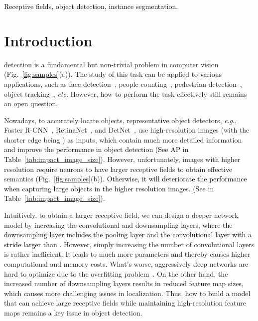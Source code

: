 \documentclass[journal]{IEEEtran}
\newcommand{\etc}{\textit{etc}\xspace}
\newcommand{\eg}{\textit{e}.\textit{g}.\xspace}
\def\qi{\textcolor{black}}
\def\qii{\textcolor{black}}
\def\myblue{\textcolor{black}}
\begin{document}
\begin{IEEEkeywords}
		\qi{Receptive fields, object detection, instance segmentation.}
	\end{IEEEkeywords}
	
	
	
	
	
\IEEEpeerreviewmaketitle
	


	\section{Introduction}


	
	
	
	 detection is a fundamental but non-trivial problem in computer vision (Fig.~\ref{fig:samples}(a)).
The study of this task can be applied to \myblue{various} applications, such as face detection~\cite{jiang2017face,yang2016wider,yang2018faceness}, people counting~\cite{shami2018people,stewart2016end}, pedestrian detection~\cite{wang2018pedestrian,li2017scale,qian2019oriented}, object tracking~\cite{feichtenhofer2017detect,yuan2017incremental,chen2018learning,hu2018robust,wang2018learning}, \etc. However, how to \myblue{perform} the task effectively still remains an open question.


	
	Nowadays, to accurately locate objects, representative object detectors, \eg, Faster R-CNN~\cite{ren2015faster}, RetinaNet~\cite{lin2017focal}, and DetNet~\cite{li2018detnet}, use high-resolution images (with the shorter edge being ) as inputs, which contain much more detailed information 
	\qii{and improve the performance in object detection (See AP in Table~\ref{tab:impact_image_size}).}
However, unfortunately, images with higher resolution require neurons to have larger receptive fields to obtain \myblue{effective} semantics (Fig.~\ref{fig:samples}(b)).
	\qii{Otherwise, it will deteriorate the performance when capturing large objects in the higher resolution images. (See  in Table~\ref{tab:impact_image_size}).}


	
	Intuitively, to obtain a larger receptive field, we can design a deeper network model by increasing the convolutional and downsampling layers, \myblue{where the downsampling layer includes the pooling layer and the convolutional layer with a stride larger than .}
However, simply increasing the number of convolutional layers is rather inefficient. It leads to much more parameters and thereby causes higher computational and memory costs. What's worse, aggressively deep networks are hard to optimize due to the overfitting problem~\cite{he2016deep}. On the other hand, the increased number of downsampling layers results in reduced feature map sizes, which causes more challenging issues in localization. Thus, how to \myblue{build a model} that can achieve large receptive fields while maintaining high-resolution feature maps remains a key issue in object detection.
	
\end{document}
